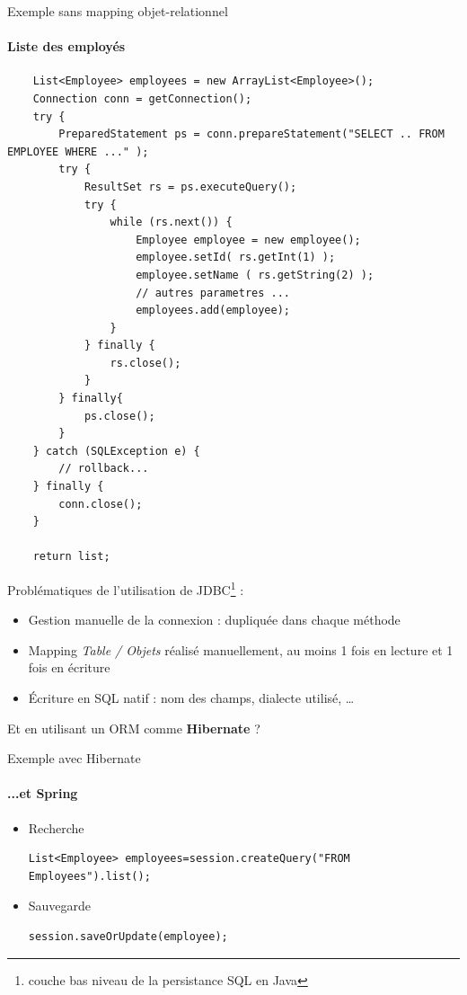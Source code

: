 \documentclass[compress]{beamer}%
\begin{document}
\begin{frame}[containsverbatim]{Exemple sans mapping objet-relationnel}
	\framesubtitle{Liste des employés}
	\begin{lstlisting}
	List<Employee> employees = new ArrayList<Employee>();
	Connection conn = getConnection();
	try {
		PreparedStatement ps = conn.prepareStatement("SELECT .. FROM EMPLOYEE WHERE ..." );
		try {
			ResultSet rs = ps.executeQuery();
			try {
				while (rs.next()) {
					Employee employee = new employee();
					employee.setId( rs.getInt(1) );
					employee.setName ( rs.getString(2) );
					// autres parametres ...
					employees.add(employee);
				}
			} finally {
				rs.close();
			}
		} finally{ 
			ps.close(); 
		}
	} catch (SQLException e) { 
		// rollback...
	} finally { 
		conn.close(); 
	}
	
	return list;
	\end{lstlisting}	
	
\end{frame}
	
\begin{frame}
	Problématiques de l'utilisation de JDBC\footnote{couche bas niveau de la persistance SQL en Java} :
	\begin{itemize}
	\item Gestion manuelle de la connexion : dupliquée dans chaque méthode
	\item Mapping \emph{Table / Objets} réalisé manuellement, au moins 1 fois en lecture et 1 fois en écriture
	\item Écriture en SQL natif : nom des champs, dialecte utilisé, \dots
	\end{itemize}
	
	\pause
	\begin{block}{}
	\center
	Et en utilisant un ORM comme \textbf{Hibernate} ?
	\end{block}
		
\end{frame}
		
\begin{frame}[fragile]{Exemple avec Hibernate}
	\framesubtitle{...et Spring}
	
	\begin{itemize}[<+->]
	\item Recherche
	\begin{lstlisting}
List<Employee> employees=session.createQuery("FROM Employees").list();
\end{lstlisting}
	\item Sauvegarde
	\begin{lstlisting}
session.saveOrUpdate(employee);
	\end{lstlisting}	
	\end{itemize}	
\end{frame}
\end{document}
